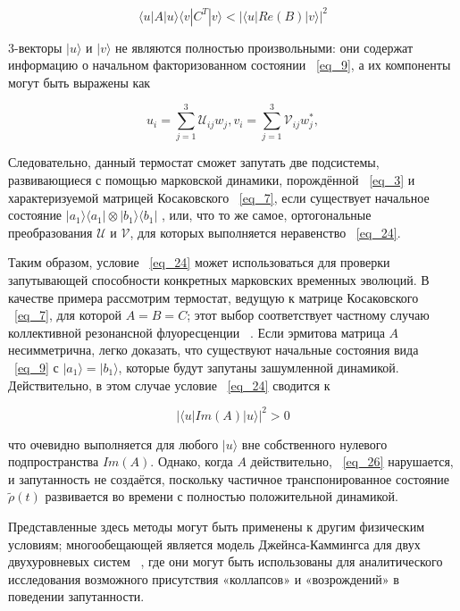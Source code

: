 \documentclass[11pt]{article}
\begin{document}
\begin{equation}
\langle u | A | u \rangle \langle v | C^T | v \rangle <
|\langle u|Re(B)|v\rangle|^2
\label{eq_24}
\end{equation}

3-векторы $|u\rangle$ и $|v\rangle$ не являются полностью произвольными: они содержат информацию о начальном факторизованном состоянии ~\ref{eq_9}, а их компоненты могут быть выражены как

\begin{equation}
u_i=\sum\limits_{j=1}^3 \mathscr{U}_{ij}w_j,
v_i=\sum\limits_{j=1}^3 \mathscr{V}_{ij}w_j^{*},
\label{eq_25}
\end{equation}

Следовательно, данный термостат сможет запутать две подсистемы, развивающиеся с помощью марковской динамики, порождённой ~\ref{eq_3} и характеризуемой матрицей Косаковского ~\ref{eq_7}, если существует начальное состояние $|a_1\rangle \langle a_1 | \otimes |b_1 \rangle \langle b_1 |$ , или, что то же самое, ортогональные преобразования $\mathscr{U}$ и $\mathscr{V}$, для которых выполняется неравенство ~\ref{eq_24}.

Таким образом, условие ~\ref{eq_24} может использоваться для проверки запутывающей способности конкретных марковских временных эволюций. В качестве примера рассмотрим термостат, ведущую к матрице Косаковского ~\ref{eq_7}, для которой $A=B=C$; этот выбор соответствует частному случаю коллективной резонансной флуоресценции
~\cite{b13,18}. Если эрмитова матрица $A$ несимметрична, легко доказать, что существуют начальные состояния вида ~\ref{eq_9} с $|a_1\rangle = |b_1 \rangle$, которые будут запутаны зашумленной динамикой. Действительно, в этом случае условие ~\ref{eq_24} сводится к

\begin{equation}
|\langle u | Im(A) | u \rangle |^2 > 0
\label{eq_26}
\end{equation}

что очевидно выполняется для любого $|u \rangle$ вне собственного нулевого подпространства $Im(A)$. Однако, когда $A$ действительно, ~\ref{eq_26} нарушается, и запутанность не создаётся, поскольку частичное транспонированное состояние $\tilde{\rho}(t)$ развивается во времени с полностью положительной динамикой.

Представленные здесь методы могут быть применены к другим физическим условиям; многообещающей является модель Джейнса-Каммингса для двух двухуровневых систем ~\cite{b13,b19,b20}, где они могут быть использованы для аналитического исследования возможного присутствия «коллапсов» и «возрождений» в поведении запутанности.
\end{document}

